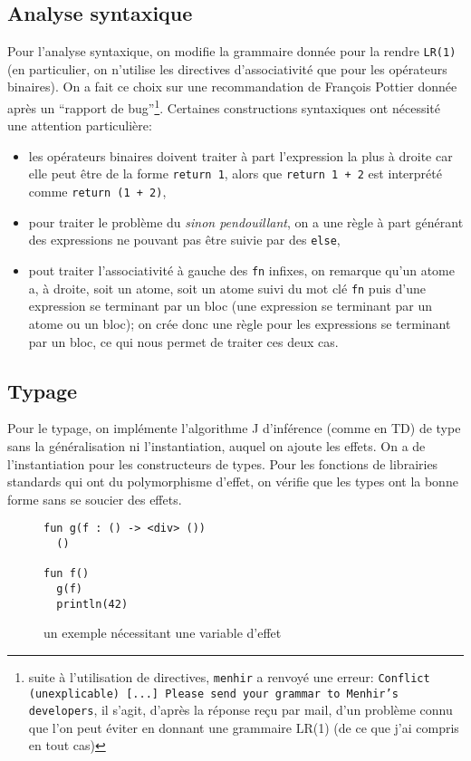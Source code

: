 \documentclass[11pt]{article}
\begin{document}
\subsection{Analyse syntaxique}
Pour l'analyse syntaxique, on modifie la grammaire donnée pour la rendre
\texttt{LR(1)} (en particulier, on n'utilise les directives d'associativité que
pour les opérateurs binaires). On a fait ce choix sur une recommandation de
François Pottier donnée après un ``rapport de bug''\footnote{suite à
l'utilisation de directives, \texttt{menhir} a renvoyé une erreur:
\texttt{Conflict (unexplicable) [...]  Please send your grammar to Menhir's
  developers}, il s'agit, d'après la réponse reçu par mail, d'un problème connu
que l'on peut éviter en donnant une grammaire LR(1) (de ce que j'ai compris en
tout cas)}. Certaines constructions syntaxiques ont nécessité une attention
particulière:
\begin{itemize}
  \item les opérateurs binaires doivent traiter à part l'expression la plus à
    droite car elle peut être de la forme \texttt{return 1}, alors que
    \texttt{return 1 + 2} est interprété comme \texttt{return (1 + 2)},
  \item pour traiter le problème du \textit{sinon pendouillant}, on a une règle
    à part générant des expressions ne pouvant pas être suivie par des
    \texttt{else},
  \item pout traiter l'associativité à gauche des \texttt{fn} infixes, on
    remarque qu'un atome a, à droite, soit un atome, soit un atome suivi du mot
    clé \texttt{fn} puis d'une expression se terminant par un bloc (une
    expression se terminant par un atome ou un bloc); on crée donc une règle
    pour les expressions se terminant par un bloc, ce qui nous permet de traiter
    ces deux cas.
\end{itemize}

\subsection{Typage}
Pour le typage, on implémente l'algorithme J d'inférence (comme en TD) de type
sans la généralisation ni l'instantiation, auquel on ajoute les effets. On a de
l'instantiation pour les constructeurs de types. Pour les fonctions de
librairies standards qui ont du polymorphisme d'effet, on vérifie que les types
ont la bonne forme sans se soucier des effets.

\begin{figure}[h]
\begin{verbatim}
fun g(f : () -> <div> ())
  ()

fun f()
  g(f)
  println(42)
\end{verbatim}
\caption{un exemple nécessitant une variable d'effet}\label{code2}
\end{figure}
\end{document}
